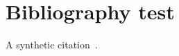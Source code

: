 \documentclass{article}
\begin{document}
\section{Bibliography test}
A synthetic citation~\cite{loom2026}.


\end{document}
